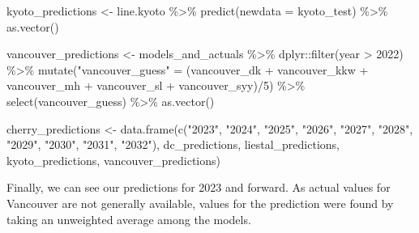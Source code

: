 \documentclass[
]{article}
\newenvironment{Shaded}{\begin{snugshade}}{\end{snugshade}}
\newcommand{\AttributeTok}[1]{\textcolor[rgb]{0.77,0.63,0.00}{#1}}
\newcommand{\DecValTok}[1]{\textcolor[rgb]{0.00,0.00,0.81}{#1}}
\newcommand{\FunctionTok}[1]{\textcolor[rgb]{0.00,0.00,0.00}{#1}}
\newcommand{\NormalTok}[1]{#1}
\newcommand{\OtherTok}[1]{\textcolor[rgb]{0.56,0.35,0.01}{#1}}
\newcommand{\SpecialCharTok}[1]{\textcolor[rgb]{0.00,0.00,0.00}{#1}}
\newcommand{\StringTok}[1]{\textcolor[rgb]{0.31,0.60,0.02}{#1}}
\begin{document}
\begin{Shaded}
\begin{Highlighting}[]
\NormalTok{kyoto\_predictions }\OtherTok{\textless{}{-}}\NormalTok{ line.kyoto }\SpecialCharTok{\%\textgreater{}\%}
  \FunctionTok{predict}\NormalTok{(}\AttributeTok{newdata =}\NormalTok{ kyoto\_test) }\SpecialCharTok{\%\textgreater{}\%}
  \FunctionTok{as.vector}\NormalTok{()}

\NormalTok{vancouver\_predictions }\OtherTok{\textless{}{-}}\NormalTok{ models\_and\_actuals }\SpecialCharTok{\%\textgreater{}\%} 
\NormalTok{  dplyr}\SpecialCharTok{::}\FunctionTok{filter}\NormalTok{(year }\SpecialCharTok{\textgreater{}} \DecValTok{2022}\NormalTok{) }\SpecialCharTok{\%\textgreater{}\%}
  \FunctionTok{mutate}\NormalTok{(}\StringTok{"vancouver\_guess"} \OtherTok{=}\NormalTok{ (vancouver\_dk }\SpecialCharTok{+}\NormalTok{ vancouver\_kkw }\SpecialCharTok{+}\NormalTok{ vancouver\_mh }\SpecialCharTok{+}\NormalTok{ vancouver\_sl }\SpecialCharTok{+}\NormalTok{ vancouver\_syy)}\SpecialCharTok{/}\DecValTok{5}\NormalTok{) }\SpecialCharTok{\%\textgreater{}\%}
  \FunctionTok{select}\NormalTok{(vancouver\_guess) }\SpecialCharTok{\%\textgreater{}\%}
  \FunctionTok{as.vector}\NormalTok{()}

\NormalTok{cherry\_predictions }\OtherTok{\textless{}{-}} \FunctionTok{data.frame}\NormalTok{(}\FunctionTok{c}\NormalTok{(}\StringTok{"2023"}\NormalTok{, }\StringTok{"2024"}\NormalTok{, }\StringTok{"2025"}\NormalTok{, }\StringTok{"2026"}\NormalTok{, }\StringTok{"2027"}\NormalTok{, }\StringTok{"2028"}\NormalTok{, }\StringTok{"2029"}\NormalTok{, }\StringTok{"2030"}\NormalTok{, }\StringTok{"2031"}\NormalTok{, }\StringTok{"2032"}\NormalTok{), dc\_predictions, liestal\_predictions, kyoto\_predictions, vancouver\_predictions)}
\end{Highlighting}
\end{Shaded}

Finally, we can see our predictions for 2023 and forward. As actual
values for Vancouver are not generally available, values for the
prediction were found by taking an unweighted average among the models.
\end{document}
